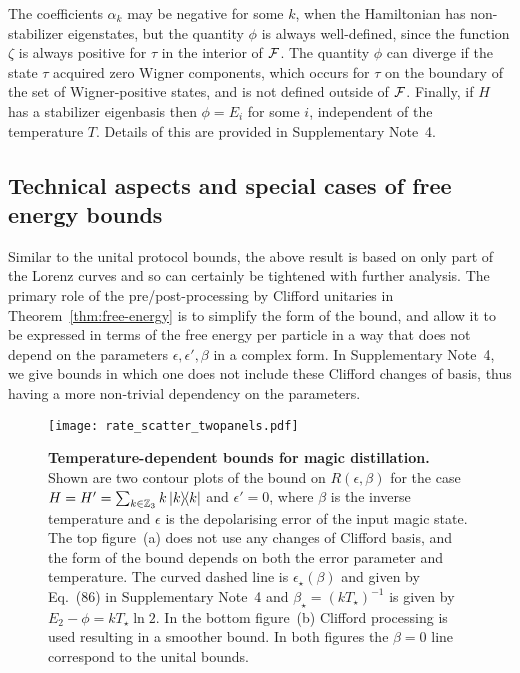 \documentclass[
onecolumn,
superscriptaddress
]{revtex4-1}
\newcommand{\revhigh}[1]{{\color{red}#1}}
\def\F{{\cal F}}
\begin{document}
The coefficients $\alpha_k$ may be negative for some $k$, when the Hamiltonian has non-stabilizer eigenstates, but the quantity $\phi$ is always well-defined, since the function $\zeta$ is always positive for $\tau$ in the interior of $\F$. The quantity $\phi$ can diverge if the state $\tau$ acquired zero Wigner components, which occurs for $\tau$ on the boundary of the set of Wigner-positive states, and is not defined outside of $\F$. Finally, if $H$ has a stabilizer eigenbasis then $\phi = E_i$ for some $i$, independent of the temperature $T$. Details of this are provided in Supplementary Note~4.

\revhigh{
\subsection*{Technical aspects and special cases of free energy bounds}
}

Similar to the unital protocol bounds, the above result is based on only part of the Lorenz curves and so can certainly be tightened with further analysis. The primary role of the pre/post-processing by Clifford unitaries in Theorem~\ref{thm:free-energy} is to simplify the form of the bound, and allow it to be expressed in terms of the free energy per particle in a way that does not depend on the parameters $\epsilon, \epsilon', \beta$ in a complex form. In Supplementary Note~4, we give bounds in which one does not include these Clifford changes of basis, thus having a more non-trivial dependency on the parameters.

\begin{figure}[t!]
    \centering
    \texttt{[image: rate\_scatter\_twopanels.pdf]}
    \caption{\textbf{Temperature-dependent bounds for magic distillation.} Shown are two contour plots of the bound on $R(\epsilon, \beta)$ for the case $H = H' = \sum_{k \in \mathbb{Z}_3} k \ketbra{k}$ and $\epsilon' = 0$, where $\beta$ is the inverse temperature and $\epsilon$ is the depolarising error of the input magic state. 
The top figure~(a) does not use any changes of Clifford basis, and the form of the bound depends on both the error parameter and temperature. The curved dashed line is $\epsilon_\star(\beta)$ and given by Eq.~(86) in Supplementary Note~4 and $\beta_\star = (kT_\star)^{-1}$ is given by $E_2-\phi = kT_\star \ln 2$. 
In the bottom figure~(b) Clifford processing is used resulting in a smoother bound. In both figures the $\beta = 0$ line correspond to the unital bounds.}
    \label{fig:rate_contour}
\end{figure}
\end{document}
